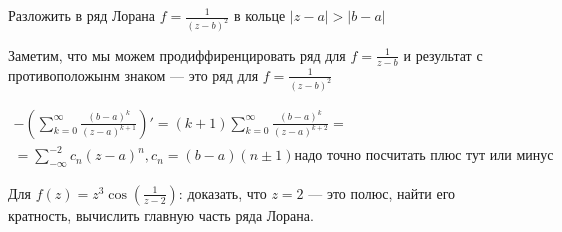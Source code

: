 \begin{exmpl}
    Разложить в ряд Лорана $f = \frac{1}{(z - b)^2}$ в кольце $|z - a| > |b - a|$
\end{exmpl}
\begin{sol}
    Заметим, что мы можем продиффиренцировать ряд для $f = \frac{1}{z - b}$ и результат с противоположынм знаком --- это ряд для $f = \frac{1}{(z - b)^2}$

    \begin{gather*}
        - \left( \sum\limits_{k = 0}^{\infty} \frac{(b - a)^k}{(z - a)^{k + 1}} \right)' = (k + 1)\sum\limits_{k = 0}^{\infty} \frac{(b - a)^k}{(z - a)^{k + 2}} = \\ 
        = \sum\limits_{-\infty}^{-2}c_n(z - a)^n, c_n = (b - a)(n \pm 1) \textrm{надо точно посчитать плюс тут или минус}
    \end{gather*}
\end{sol}

\begin{exmpl}
    Для $f(z) = z^3 \cos \left( \frac{1}{z - 2} \right)$: доказать, что $z = 2$ --- это полюс, найти его кратность, вычислить главную часть ряда Лорана.
\end{exmpl}
\begin{sol}
    
\end{sol}